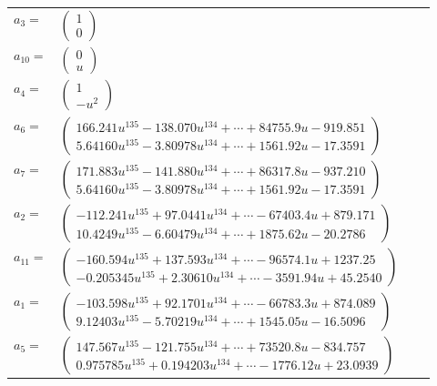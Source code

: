 \documentclass[1p]{elsarticle_modified}
\theoremstyle{definition}
\begin{document}
\begin{tabular}{m{7pt} m{180pt} m{7pt} m{180pt} }
\flushright $a_{3}=$&$\begin{pmatrix}1\\0\end{pmatrix}$ \\
\flushright $a_{10}=$&$\begin{pmatrix}0\\u\end{pmatrix}$ \\
\flushright $a_{4}=$&$\begin{pmatrix}1\\- u^2\end{pmatrix}$ \\
\flushright $a_{6}=$&$\begin{pmatrix}166.241 u^{135}-138.070 u^{134}+\cdots+84755.9 u-919.851\\5.64160 u^{135}-3.80978 u^{134}+\cdots+1561.92 u-17.3591\end{pmatrix}$ \\
\flushright $a_{7}=$&$\begin{pmatrix}171.883 u^{135}-141.880 u^{134}+\cdots+86317.8 u-937.210\\5.64160 u^{135}-3.80978 u^{134}+\cdots+1561.92 u-17.3591\end{pmatrix}$ \\
\flushright $a_{2}=$&$\begin{pmatrix}-112.241 u^{135}+97.0441 u^{134}+\cdots-67403.4 u+879.171\\10.4249 u^{135}-6.60479 u^{134}+\cdots+1875.62 u-20.2786\end{pmatrix}$ \\
\flushright $a_{11}=$&$\begin{pmatrix}-160.594 u^{135}+137.593 u^{134}+\cdots-96574.1 u+1237.25\\-0.205345 u^{135}+2.30610 u^{134}+\cdots-3591.94 u+45.2540\end{pmatrix}$ \\
\flushright $a_{1}=$&$\begin{pmatrix}-103.598 u^{135}+92.1701 u^{134}+\cdots-66783.3 u+874.089\\9.12403 u^{135}-5.70219 u^{134}+\cdots+1545.05 u-16.5096\end{pmatrix}$ \\
\flushright $a_{5}=$&$\begin{pmatrix}147.567 u^{135}-121.755 u^{134}+\cdots+73520.8 u-834.757\\0.975785 u^{135}+0.194203 u^{134}+\cdots-1776.12 u+23.0939\end{pmatrix}$ \\

\end{tabular}
\end{document}

